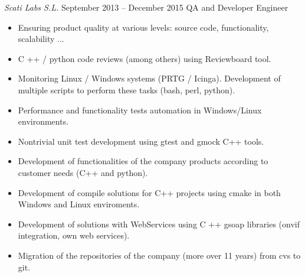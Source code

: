 \documentclass[10pt]{res} %
\begin{document}
\begin{resume}
{\sl Scati Labs S.L.} \hfill September 2013 -- December 2015
\hfill QA and Developer Engineer
\begin{itemize} \itemsep -2pt %
\item Ensuring product quality at various levels: source code, functionality, scalability ...
\item C ++ / python code reviews (among others) using Reviewboard tool.
\item Monitoring Linux / Windows systems (PRTG / Icinga). Development of multiple scripts to perform these tasks (bash, perl, python).
\item Performance and functionality tests automation in Windows/Linux environments.
\item Nontrivial unit test development using gtest and gmock C++ tools.
\item Development of functionalities of the company products according to customer needs (C++ and python).
\item Development of compile solutions for C++ projects using cmake in both Windows and Linux enviroments.
\item Development of solutions with WebServices using C ++ gsoap libraries (onvif integration, own web services).
\item Migration of the repositories of the company (more over 11 years) from cvs to git.
\end{itemize}


\end{resume}
\end{document}
